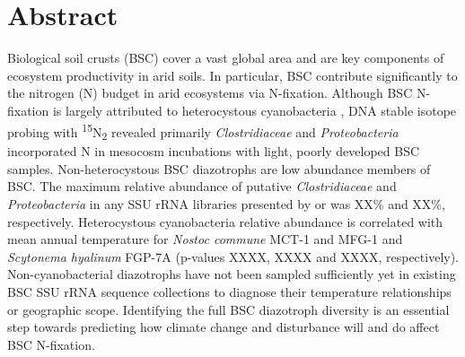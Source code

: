\section{Abstract}
Biological soil crusts (BSC) cover a vast global area and are key components of ecosystem productivity in arid soils. In particular, BSC contribute significantly to the nitrogen (N) budget in arid ecosystems via N-fixation. Although BSC N-fixation is largely attributed to heterocystous cyanobacteria \cite{Yeager, 14766579, Yeager_2012}, DNA stable isotope probing with \textsuperscript{15}N\textsubscript{2} revealed primarily \textit{Clostridiaceae} and \textit{Proteobacteria} incorporated N in mesocosm incubations with light, poorly developed BSC samples. Non-heterocystous BSC diazotrophs are low abundance members of BSC. The maximum relative abundance of putative \textit{Clostridiaceae} and \textit{Proteobacteria} in any SSU rRNA libraries presented by \citet{Garcia_Pichel_2013} or \citet{Steven_2013} was XX\% and XX\%, respectively. Heterocystous cyanobacteria relative abundance is correlated with mean annual temperature for \textit{Nostoc commune} MCT-1 and MFG-1 and \textit{Scytonema hyalinum} FGP-7A (p-values XXXX, XXXX and XXXX, respectively). Non-cyanobacterial diazotrophs have not been sampled sufficiently yet in existing BSC SSU rRNA sequence collections to diagnose their temperature relationships or geographic scope. Identifying the full BSC diazotroph diversity is an essential step towards predicting how climate change and disturbance will and do affect BSC N-fixation.